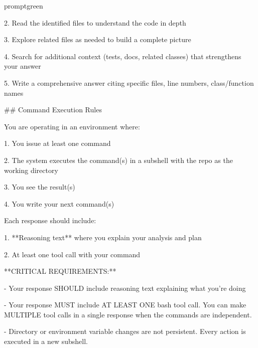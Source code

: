 \documentclass{llmxive}
\begin{document}
\begin{promptbox}{promptgreen}
{2. Read the identified files to understand the code in depth\par
3. Explore related files as needed to build a complete picture\par
4. Search for additional context (tests, docs, related classes) that strengthens your answer\par
5. Write a comprehensive answer citing specific files, line numbers, class/function names\par
\vspace{0.35em}\par
\#\# Command Execution Rules\par
\vspace{0.35em}\par
You are operating in an environment where:\par
\vspace{0.35em}\par
1. You issue at least one command\par
2. The system executes the command(s) in a subshell with the repo as the working directory\par
3. You see the result(s)\par
4. You write your next command(s)\par
\vspace{0.35em}\par
Each response should include:\par
\vspace{0.35em}\par
1. **Reasoning text** where you explain your analysis and plan\par
2. At least one tool call with your command\par
\vspace{0.35em}\par
**CRITICAL REQUIREMENTS:**\par
\vspace{0.35em}\par
- Your response SHOULD include reasoning text explaining what you're doing\par
- Your response MUST include AT LEAST ONE bash tool call. You can make MULTIPLE tool calls in a single response when the commands are independent.\par
- Directory or environment variable changes are not persistent. Every action is executed in a new subshell.\par
\vspace{0.35em}\par
}
\end{promptbox}
\end{document}

